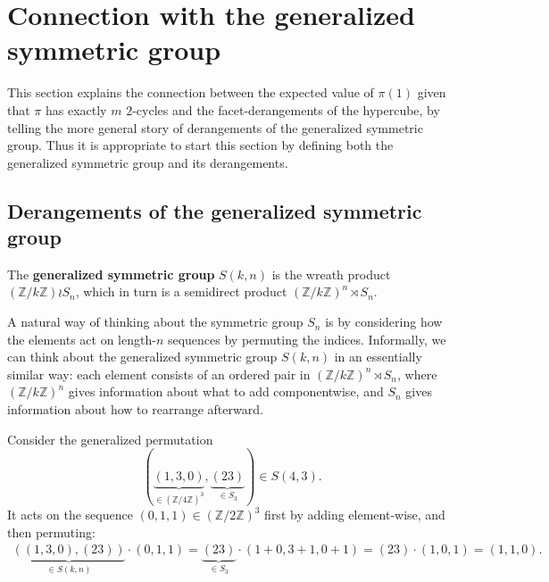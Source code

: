 \section{Connection with the generalized symmetric group}
\label{section:wreathProduct}
This section explains the connection between the expected value of $\pi(1)$
given that $\pi$ has exactly $m$ $2$-cycles and the facet-derangements of the
hypercube, by telling the more general story of derangements of the generalized
symmetric group. Thus it is appropriate to start this section by defining
both the generalized symmetric group and its derangements.

\subsection{Derangements of the generalized symmetric group}
\begin{definition}
  The \textbf{generalized symmetric group} $S(k,n)$ is the wreath product
  $(\mathbb{Z}/k\mathbb{Z}) \wr S_n$, which in turn is a semidirect product
  $(\mathbb{Z}/k\mathbb{Z})^n \rtimes S_n$.
\end{definition}


A natural way of thinking about the symmetric group $S_n$ is by considering
how the elements act on length-$n$ sequences by permuting the indices.
Informally, we can think about the generalized symmetric group $S(k,n)$ in an
essentially similar way: each element consists of an ordered pair in
$(\mathbb{Z}/k\mathbb{Z})^n \rtimes S_n$, where $(\mathbb{Z}/k\mathbb{Z})^n$ gives information about
what to add componentwise, and $S_n$ gives information about how to rearrange
afterward.

\begin{example}
  Consider the generalized permutation \begin{equation}
    (\underbrace{(1,3,0)}_{\in (\mathbb{Z}/4\mathbb{Z})^3}, \underbrace{(23)}_{\in S_3}) \in S(4,3).
  \end{equation}
  It acts on the sequence $(0,1,1) \in (\mathbb{Z}/2\mathbb{Z})^3$ first by adding
  element-wise, and then permuting: \begin{align}
    \underbrace{((1,3,0),(23))}_{\in S(k,n)} \cdot (0,1,1)
    = \underbrace{(23)}_{\in S_3} \cdot (1+0,3+1,0+1)
    = (23) \cdot (1,0,1)
    = (1,1,0).
  \end{align}
\end{example}

